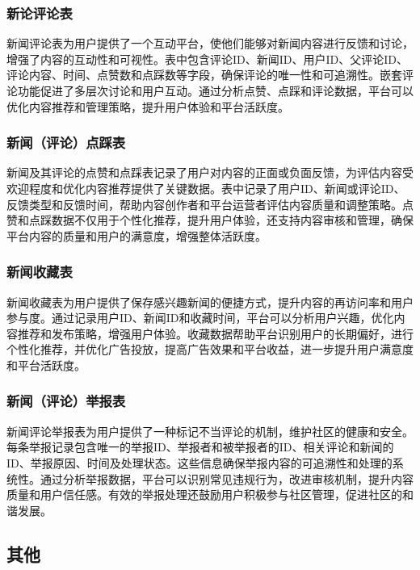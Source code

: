 \subsubsection{新论评论表}

新闻评论表为用户提供了一个互动平台，使他们能够对新闻内容进行反馈和讨论，增强了内容的互动性和可视性。表中包含评论ID、新闻ID、用户ID、父评论ID、评论内容、时间、点赞数和点踩数等字段，确保评论的唯一性和可追溯性。嵌套评论功能促进了多层次讨论和用户互动。通过分析点赞、点踩和评论数据，平台可以优化内容推荐和管理策略，提升用户体验和平台活跃度。

\subsubsection{新闻（评论）点踩表}

新闻及其评论的点赞和点踩表记录了用户对内容的正面或负面反馈，为评估内容受欢迎程度和优化内容推荐提供了关键数据。表中记录了用户ID、新闻或评论ID、反馈类型和反馈时间，帮助内容创作者和平台运营者评估内容质量和调整策略。点赞和点踩数据不仅用于个性化推荐，提升用户体验，还支持内容审核和管理，确保平台内容的质量和用户的满意度，增强整体活跃度。

\subsubsection{新闻收藏表}

新闻收藏表为用户提供了保存感兴趣新闻的便捷方式，提升内容的再访问率和用户参与度。通过记录用户ID、新闻ID和收藏时间，平台可以分析用户兴趣，优化内容推荐和发布策略，增强用户体验。收藏数据帮助平台识别用户的长期偏好，进行个性化推荐，并优化广告投放，提高广告效果和平台收益，进一步提升用户满意度和平台活跃度。

\subsubsection{新闻（评论）举报表}

新闻评论举报表为用户提供了一种标记不当评论的机制，维护社区的健康和安全。每条举报记录包含唯一的举报ID、举报者和被举报者的ID、相关评论和新闻的ID、举报原因、时间及处理状态。这些信息确保举报内容的可追溯性和处理的系统性。通过分析举报数据，平台可以识别常见违规行为，改进审核机制，提升内容质量和用户信任感。有效的举报处理还鼓励用户积极参与社区管理，促进社区的和谐发展。

\subsection{其他}

